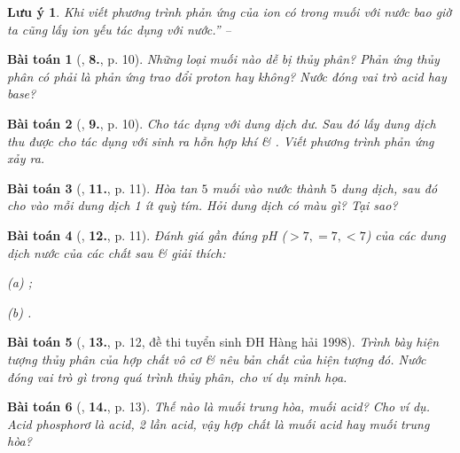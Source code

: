 \documentclass{article}
\numberwithin{equation}{section}
\newtheorem{baitoan}{Bài toán}[section]
\newtheorem{luuy}{Lưu ý}[section]
\begin{document}
\begin{luuy}
	Khi viết phương trình phản ứng của ion có trong muối với nước bao giờ ta cũng lấy ion yếu tác dụng với nước.'' -- \cite[pp. 8--9]{An2004}
\end{luuy}

\begin{baitoan}[\cite{An2004}, \textbf{8.}, p. 10]
	Những loại muối nào dễ bị thủy phân? Phản ứng thủy phân có phải là phản ứng trao đổi proton hay không? Nước đóng vai trò acid hay base?
\end{baitoan}

\begin{baitoan}[\cite{An2004}, \textbf{9.}, p. 10]
	Cho \emph{} tác dụng với dung dịch \emph{} dư. Sau đó lấy dung dịch thu được cho tác dụng với \emph{} sinh ra hỗn hợp khí \emph{} \& \emph{}. Viết phương trình phản ứng xảy ra.
\end{baitoan}

\begin{baitoan}[\cite{An2004}, \textbf{11.}, p. 11]
	Hòa tan $5$ muối \emph{} vào nước thành $5$ dung dịch, sau đó cho vào mỗi dung dịch 1 ít quỳ tím. Hỏi dung dịch có màu gì? Tại sao?
\end{baitoan}

\begin{baitoan}[\cite{An2004}, \textbf{12.}, p. 11]
	Đánh giá gần đúng pH ($> 7, =7, < 7$) của các dung dịch nước của các chất sau \& giải thích:
	\begin{enumerate*}
		\item[(a)] \emph{};
		\item[(b)] \emph{}.
	\end{enumerate*}
\end{baitoan}

\begin{baitoan}[\cite{An2004}, \textbf{13.}, p. 12, đề thi tuyển sinh ĐH Hàng hải 1998]
	Trình bày hiện tượng thủy phân của hợp chất vô cơ \& nêu bản chất của hiện tượng đó. Nước đóng vai trò gì trong quá trình thủy phân, cho ví dụ minh họa.
\end{baitoan}

\begin{baitoan}[\cite{An2004}, \textbf{14.}, p. 13]
	Thế nào là muối trung hòa, muối acid? Cho ví dụ. Acid phosphorơ \emph{} là acid, 2 lần acid, vậy hợp chất \emph{} là muối acid hay muối trung hòa?
\end{baitoan}
\end{document}

